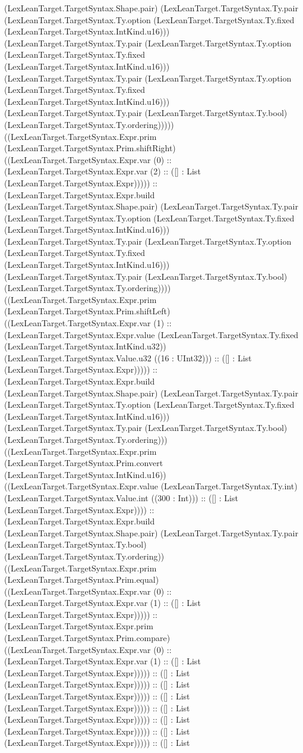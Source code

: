 \documentclass[11pt]{article}
\begin{document}
(LexLeanTarget.TargetSyntax.Shape.pair) (LexLeanTarget.TargetSyntax.Ty.pair (LexLeanTarget.TargetSyntax.Ty.option (LexLeanTarget.TargetSyntax.Ty.fixed (LexLeanTarget.TargetSyntax.IntKind.u16))) (LexLeanTarget.TargetSyntax.Ty.pair (LexLeanTarget.TargetSyntax.Ty.option (LexLeanTarget.TargetSyntax.Ty.fixed (LexLeanTarget.TargetSyntax.IntKind.u16))) (LexLeanTarget.TargetSyntax.Ty.pair (LexLeanTarget.TargetSyntax.Ty.option (LexLeanTarget.TargetSyntax.Ty.fixed (LexLeanTarget.TargetSyntax.IntKind.u16))) (LexLeanTarget.TargetSyntax.Ty.pair (LexLeanTarget.TargetSyntax.Ty.bool) (LexLeanTarget.TargetSyntax.Ty.ordering))))) ((LexLeanTarget.TargetSyntax.Expr.prim (LexLeanTarget.TargetSyntax.Prim.shiftRight) ((LexLeanTarget.TargetSyntax.Expr.var (0) :: (LexLeanTarget.TargetSyntax.Expr.var (2) :: ([] : List (LexLeanTarget.TargetSyntax.Expr))))) :: (LexLeanTarget.TargetSyntax.Expr.build (LexLeanTarget.TargetSyntax.Shape.pair) (LexLeanTarget.TargetSyntax.Ty.pair (LexLeanTarget.TargetSyntax.Ty.option (LexLeanTarget.TargetSyntax.Ty.fixed (LexLeanTarget.TargetSyntax.IntKind.u16))) (LexLeanTarget.TargetSyntax.Ty.pair (LexLeanTarget.TargetSyntax.Ty.option (LexLeanTarget.TargetSyntax.Ty.fixed (LexLeanTarget.TargetSyntax.IntKind.u16))) (LexLeanTarget.TargetSyntax.Ty.pair (LexLeanTarget.TargetSyntax.Ty.bool) (LexLeanTarget.TargetSyntax.Ty.ordering)))) ((LexLeanTarget.TargetSyntax.Expr.prim (LexLeanTarget.TargetSyntax.Prim.shiftLeft) ((LexLeanTarget.TargetSyntax.Expr.var (1) :: (LexLeanTarget.TargetSyntax.Expr.value (LexLeanTarget.TargetSyntax.Ty.fixed (LexLeanTarget.TargetSyntax.IntKind.u32)) (LexLeanTarget.TargetSyntax.Value.u32 ((16 : UInt32))) :: ([] : List (LexLeanTarget.TargetSyntax.Expr))))) :: (LexLeanTarget.TargetSyntax.Expr.build (LexLeanTarget.TargetSyntax.Shape.pair) (LexLeanTarget.TargetSyntax.Ty.pair (LexLeanTarget.TargetSyntax.Ty.option (LexLeanTarget.TargetSyntax.Ty.fixed (LexLeanTarget.TargetSyntax.IntKind.u16))) (LexLeanTarget.TargetSyntax.Ty.pair (LexLeanTarget.TargetSyntax.Ty.bool) (LexLeanTarget.TargetSyntax.Ty.ordering))) ((LexLeanTarget.TargetSyntax.Expr.prim (LexLeanTarget.TargetSyntax.Prim.convert (LexLeanTarget.TargetSyntax.IntKind.u16)) ((LexLeanTarget.TargetSyntax.Expr.value (LexLeanTarget.TargetSyntax.Ty.int) (LexLeanTarget.TargetSyntax.Value.int ((300 : Int))) :: ([] : List (LexLeanTarget.TargetSyntax.Expr)))) :: (LexLeanTarget.TargetSyntax.Expr.build (LexLeanTarget.TargetSyntax.Shape.pair) (LexLeanTarget.TargetSyntax.Ty.pair (LexLeanTarget.TargetSyntax.Ty.bool) (LexLeanTarget.TargetSyntax.Ty.ordering)) ((LexLeanTarget.TargetSyntax.Expr.prim (LexLeanTarget.TargetSyntax.Prim.equal) ((LexLeanTarget.TargetSyntax.Expr.var (0) :: (LexLeanTarget.TargetSyntax.Expr.var (1) :: ([] : List (LexLeanTarget.TargetSyntax.Expr))))) :: (LexLeanTarget.TargetSyntax.Expr.prim (LexLeanTarget.TargetSyntax.Prim.compare) ((LexLeanTarget.TargetSyntax.Expr.var (0) :: (LexLeanTarget.TargetSyntax.Expr.var (1) :: ([] : List (LexLeanTarget.TargetSyntax.Expr))))) :: ([] : List (LexLeanTarget.TargetSyntax.Expr))))) :: ([] : List (LexLeanTarget.TargetSyntax.Expr))))) :: ([] : List (LexLeanTarget.TargetSyntax.Expr))))) :: ([] : List (LexLeanTarget.TargetSyntax.Expr))))) :: ([] : List (LexLeanTarget.TargetSyntax.Expr))))) :: ([] : List (LexLeanTarget.TargetSyntax.Expr))))) :: ([] : List 
\end{document}
